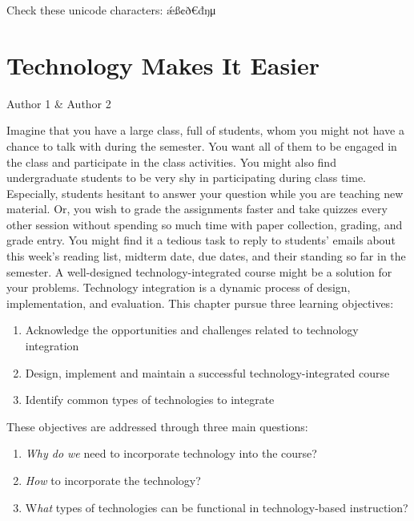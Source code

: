 \documentclass{book}
\begin{document}
Check these unicode characters: ǽß¢ð€đŋμ

\hypertarget{technology-makes-it-easier}{%
\chapter{Technology Makes It Easier}\label{technology-makes-it-easier}}

Author 1 \& Author 2

Imagine that you have a large class, full of students, whom you might not have
a chance to talk with during the semester. You want all of them to be engaged
in the class and participate in the class activities. You might also find
undergraduate students to be very shy in participating during class time.
Especially, students hesitant to answer your question while you are teaching
new material. Or, you wish to grade the assignments faster and take quizzes
every other session without spending so much time with paper collection,
grading, and grade entry. You might find it a tedious task to reply to
students' emails about this week's reading list, midterm date, due dates, and
their standing so far in the semester. A well-designed technology-integrated
course might be a solution for your problems. Technology integration is a
dynamic process of design, implementation, and evaluation. This chapter pursue
three learning objectives:

\begin{enumerate}
\def\labelenumi{\arabic{enumi}.}
\item
  Acknowledge the opportunities and challenges related to technology
  integration
\item
  Design, implement and maintain a successful technology-integrated course
\item
  Identify common types of technologies to integrate
\end{enumerate}

These objectives are addressed through three main questions:

\begin{enumerate}
\def\labelenumi{\arabic{enumi}.}
\item
  \emph{Why do we} need to incorporate technology into the course?
\item
  \emph{How} to incorporate the technology?
\item
  W\emph{hat} types of technologies can be functional in technology-based
  instruction?
\end{enumerate}
\end{document}
